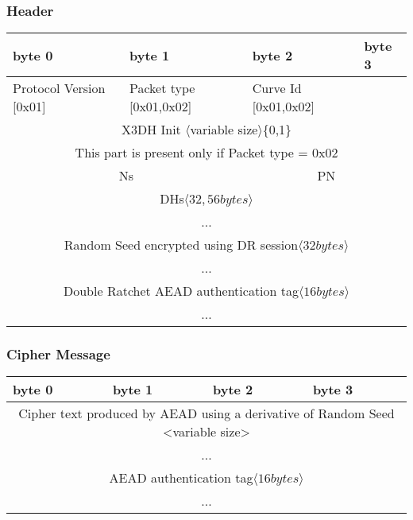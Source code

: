 \documentclass[a4paper,11pt]{article}
\begin{document}
      \subsubsection{Header}
      \begin{center}
      \begin{tabular}{ | p{1.4in} | p{1.4in} | p{1.4in} | p{1.4in} |}
        \hline
        \cellcolor[gray]{0.85} byte 0 & \cellcolor[gray]{0.85} byte 1 & \cellcolor[gray]{0.85} byte 2 & \cellcolor[gray]{0.85}byte 3\\
        \hline
        Protocol Version [0x01] & Packet type [0x01,0x02] & Curve Id [0x01,0x02] & \\
        \cline{1-3}
        \multicolumn{4}{|c|}{X3DH Init $\langle $variable size$\rangle $\{0,1\}}\\
        \multicolumn{4}{|c|}{This part is present only if Packet type = 0x02}\\
        \hline
        \multicolumn{2}{|c}{Ns}&\multicolumn{2}{|c|}{PN}\\
        \hline
        \multicolumn{4}{|c|}{DHs$\langle 32,56 bytes\rangle $}\\
        \multicolumn{4}{|c|}{...}\\
        \hline
        \multicolumn{4}{|c|}{Random Seed encrypted using DR session$\langle 32bytes\rangle $}\\
        \multicolumn{4}{|c|}{...}\\
        \hline
        \multicolumn{4}{|c|}{Double Ratchet AEAD authentication tag$\langle 16bytes\rangle $}\\
        \multicolumn{4}{|c|}{...}\\
        \hline
      \end{tabular}
      \end{center}
      
      \subsubsection{Cipher Message}
      \begin{center}
      \begin{tabular}{ | p{1.4in} | p{1.4in} | p{1.4in} | p{1.4in} |}
        \hline
        \cellcolor[gray]{0.85} byte 0 & \cellcolor[gray]{0.85} byte 1 & \cellcolor[gray]{0.85} byte 2 & \cellcolor[gray]{0.85}byte 3\\
        \hline
        \multicolumn{4}{|c|}{Cipher text produced by AEAD using a derivative of Random Seed <variable size>}\\
        \multicolumn{4}{|c|}{...}\\
        \hline
        \multicolumn{4}{|c|}{AEAD authentication tag$\langle 16bytes\rangle $}\\
        \multicolumn{4}{|c|}{...}\\
        \hline
      \end{tabular}
      \end{center}
      
\end{document}
